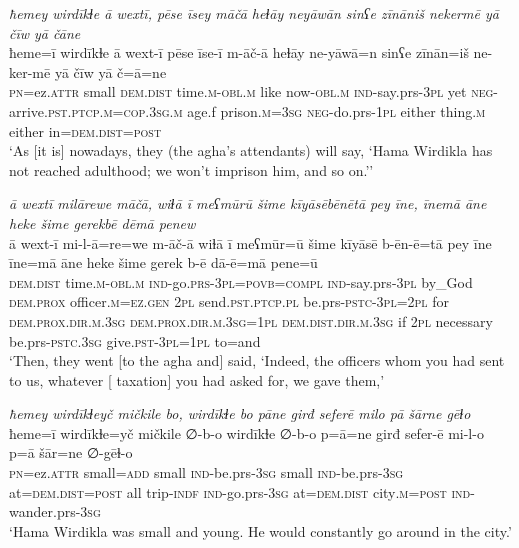 \ea \label{BP.123}
\textit{ħemey wirdīkɫe ā wextī, pēse īsey māčā heɫāy neyāwān sinʕe zīnāniš nekermē yā čīw yā čāne} \\ 
\gll ħeme=ī wirdīkɫe ā wext-ī pēse īse-ī m-āč-ā heɫāy ne-yāwā=n sinʕe zīnān=iš ne-ker-mē yā čīw yā č=ā=ne \\ 
 \textsc{pn}=ez.\textsc{attr} small \textsc{dem.dist} time\textsc{.m}\textsc{-obl}\textsc{.m} like now\textsc{-obl}\textsc{.m} \textsc{ind-}say.prs\textsc{-3pl} yet \textsc{neg-}arrive\textsc{.pst}\textsc{.ptcp}\textsc{.m}\textsc{=cop}\textsc{.3sg}\textsc{.m} age.f prison\textsc{.m}\textsc{=3sg} \textsc{neg-}do.prs\textsc{-\textsc{1pl}} either thing\textsc{.m} either in=\textsc{dem.dist}\textsc{=\textsc{post}} \\ 
\glt `As [it is] nowadays, they (the agha’s attendants) will say, ‘Hama Wirdikla has not reached adulthood; we won’t imprison him, and so on.’'
\z 
 
\ea \label{BP.124}
\textit{ā wextī milārewe māčā, wiɫā ī meʕmūrū šime kīyāsēbēnētā pey īne, īnemā āne heke šime gerekbē dēmā penew} \\ 
\gll ā wext-ī mi-l-ā=re=we m-āč-ā wiɫā ī meʕmūr=ū šime kīyāsē b-ēn-ē=tā pey īne īne=mā āne heke šime gerek b-ē dā-ē=mā pene=ū \\ 
 \textsc{dem.dist} time\textsc{.m}\textsc{-obl}\textsc{.m} \textsc{ind-}go.\textsc{prs}\textsc{-3pl}\textsc{=\textsc{povb}}\textsc{=compl} \textsc{ind-}say.prs\textsc{-3pl} by\_God \textsc{dem.prox} officer\textsc{.m}\textsc{=ez.gen} \textsc{2pl} send\textsc{.pst}\textsc{.ptcp}\textsc{.pl} be.prs\textsc{-pstc}\textsc{-3pl}=\textsc{2pl} for \textsc{dem.prox}\textsc{.dir}\textsc{.m}\textsc{.3sg} \textsc{dem.prox}\textsc{.dir}\textsc{.m}\textsc{.3sg}\textsc{=\textsc{1pl}} \textsc{dem.dist}\textsc{.dir}\textsc{.m}\textsc{.3sg} if \textsc{2pl} necessary be.prs\textsc{-pstc}\textsc{.3sg} give\textsc{.pst}\textsc{-3pl}\textsc{=\textsc{1pl}} to=and \\ 
\glt `Then, they went [to the agha and] said, ‘Indeed, the officers whom you had sent to us, whatever [ taxation] you had asked for, we gave them,'
\z 
 
\ea \label{BP.143}
\textit{ħemey wirdīkɫeyč mičkile bo, wirdīkɫe bo pāne girđ seferē milo pā šārne gēɫo} \\ 
\gll ħeme=ī wirdīkɫe=yč mičkile ∅-b-o wirdīkɫe ∅-b-o p=ā=ne girđ sefer-ē mi-l-o p=ā šār=ne ∅-gēɫ-o \\ 
 \textsc{pn}=ez.\textsc{attr} small\textsc{=add} small \textsc{ind-}be.prs\textsc{-3sg} small \textsc{ind-}be.prs\textsc{-3sg} at=\textsc{dem.dist}\textsc{=\textsc{post}} all trip\textsc{-indf} \textsc{ind-}go.prs\textsc{-3sg} at=\textsc{dem.dist} city\textsc{.m}\textsc{=\textsc{post}} \textsc{ind-}wander.prs\textsc{-3sg} \\ 
\glt `Hama Wirdikla was small and young. He would constantly go around in the city.'
\z 
 
